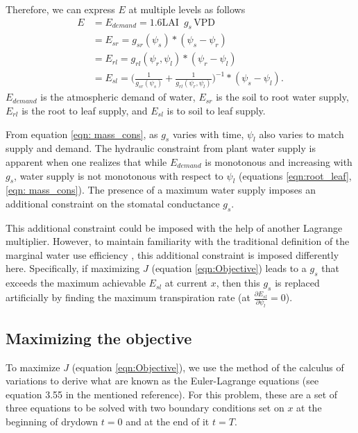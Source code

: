\documentclass[utf8]{frontiersSCNS} %
\begin{document}
Therefore, we can express $E$ at multiple levels as follows
\begin{equation}
    \label{eqn: mass_cons}
        \begin{split}
        E & = E_{demand} = 1.6 \text{LAI }\, g_s\, \text{VPD} \\
        & = E_{sr} = g_{sr}(\psi_s)*(\psi_s - \psi_r)\\
        & = E_{rl} = g_{rl}(\psi_r,\psi_l)*(\psi_r - \psi_l) \\
        & = E_{sl} = \Bigg(\frac{1}{g_{sr}(\psi_s)} + \frac{1}{g_{rl}(\psi_r,\psi_l)}\Bigg)^{-1}*(\psi_s - \psi_l).
        \end{split}
\end{equation}
$E_{demand}$ is the atmospheric demand of water, $E_{sr}$ is the soil to root water supply, $E_{rl}$ is the root to leaf supply, and $E_{sl}$ is to soil to leaf supply.

From equation \ref{eqn: mass_cons}, as $g_s$ varies with time, $\psi_l$ also varies to match supply and demand. The hydraulic constraint from plant water supply is apparent when one realizes that while $E_{demand}$ is monotonous and increasing with $g_s$, water supply is not monotonous with respect to $\psi_l$ (equations \ref{eqn:root_leaf}, \ref{eqn: mass_cons}). The presence of a maximum water supply imposes an additional constraint on the stomatal conductance $g_s$. 

This additional constraint could be imposed with the help of another Lagrange multiplier. However, to maintain familiarity with the traditional definition of the marginal water use efficiency \citep{cowan1977}, this additional constraint is imposed differently here. Specifically, if maximizing $J$ (equation \ref{eqn:Objective}) leads to a $g_s$ that exceeds the maximum achievable $E_{sl}$ at current $x$, then this $g_s$ is replaced artificially by finding the maximum transpiration rate \Big(at $\frac{\partial E_{sl}}{\partial \psi_l} = 0$\Big). 
\subsection{Maximizing the objective}

To maximize $J$ (equation \ref{eqn:Objective}), we use the method of the calculus of variations \citep{witelski2015} to derive what are known as the Euler-Lagrange equations (see equation 3.55 in the mentioned reference). For this problem, these are a set of three equations to be solved with two boundary conditions set on $x$ at the beginning of drydown $t=0$ and at the end of it $t=T$.
\end{document}
